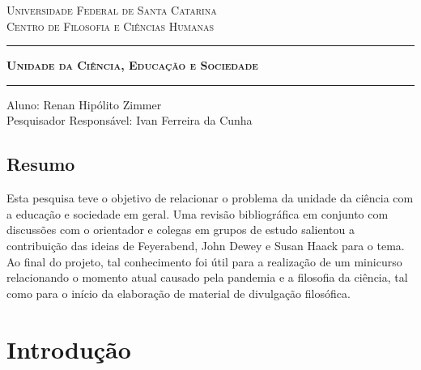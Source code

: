 \documentclass[12pt]{report}
\begin{document}
	
	\begin{center}
		\vspace*{-3cm}
		\textsc{Universidade Federal de Santa Catarina} \\
		\textsc{Centro de Filosofia e Ciências Humanas}
		
		\vspace{1cm}
		\rule{411pt}{1.3pt}
		\vspace{0.2cm}
		
		\Large \textbf{\textsc{Unidade da Ciência, Educação e Sociedade}}
		
		\rule{411pt}{1.3pt}
		\vspace{1cm}
		
		Aluno: Renan Hipólito Zimmer\\
		\vspace{0.5cm}
		Pesquisador Responsável: Ivan Ferreira da Cunha
		
		\vspace{1cm}
	\end{center}	
	
	\vspace{-0.5cm}
	\section*{Resumo}
		Esta pesquisa teve o objetivo de relacionar o problema da unidade da ciência com a educação e sociedade em geral.
		Uma revisão bibliográfica em conjunto com discussões com o orientador e colegas em grupos de estudo salientou a contribuição das ideias de Feyerabend, John Dewey e Susan Haack para o tema.
		Ao final do projeto, tal conhecimento foi útil para a realização de um minicurso relacionando o momento atual causado pela pandemia e a filosofia da ciência, tal como para o início da elaboração de material de divulgação filosófica.
		
	\newpage
	\vspace*{-3cm}
	\onehalfspacing
	\chapter*{Introdução}
	
		\vspace{-0.75cm}
\end{document}
